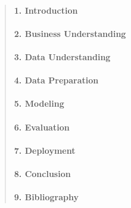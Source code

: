 \documentclass[11pt]{article}
\begin{document}
\begin{quote}
\mbox{}%
\hypertarget{introduction}{%
\paragraph{1. Introduction}\label{introduction}}

\mbox{}%
\hypertarget{business-understanding}{%
\paragraph{2. Business Understanding}\label{business-understanding}}

\mbox{}%
\hypertarget{data-understanding}{%
\paragraph{3. Data Understanding}\label{data-understanding}}

\mbox{}%
\hypertarget{data-preparation}{%
\paragraph{4. Data Preparation}\label{data-preparation}}

\mbox{}%
\hypertarget{modeling}{%
\paragraph{5. Modeling}\label{modeling}}

\mbox{}%
\hypertarget{evaluation}{%
\paragraph{6. Evaluation}\label{evaluation}}

\mbox{}%
\hypertarget{deployment}{%
\paragraph{7. Deployment}\label{deployment}}

\mbox{}%
\hypertarget{conclusion}{%
\paragraph{8. Conclusion}\label{conclusion}}

\mbox{}%
\hypertarget{bibliography}{%
\paragraph{9. Bibliography}\label{bibliography}}
\end{quote}
\end{document}

